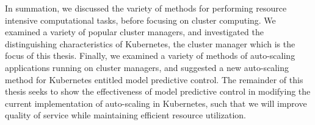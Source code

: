 In summation, we discussed the variety of methods for performing resource intensive
computational tasks, before focusing on cluster computing. We examined a variety
of popular cluster managers, and investigated the distinguishing characteristics
of Kubernetes, the cluster manager which is the focus of this thesis. Finally, we examined
a variety of methods of auto-scaling applications running on cluster managers,
and suggested a new auto-scaling method for Kubernetes entitled
model predictive control. The remainder of this thesis
seeks to show the effectiveness of model predictive control in modifying the
current implementation of auto-scaling in Kubernetes, such that we will improve
quality of service while maintaining efficient resource utilization.

